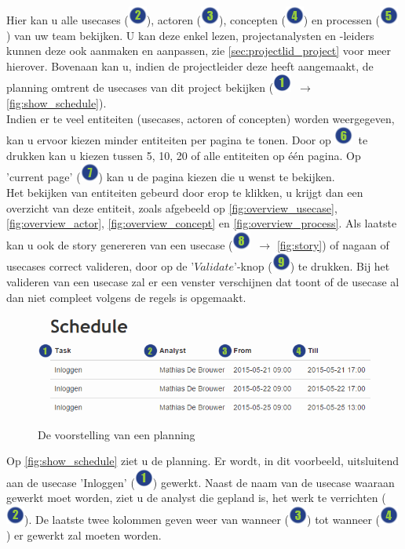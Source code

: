 \documentclass[a4paper,11pt]{article}
\newcommand{\one}{\includegraphics[scale=0.5]{Gebruikershandleiding_img/1.png}}
\newcommand{\two}{\includegraphics[scale=0.5]{Gebruikershandleiding_img/2.png}}
\newcommand{\three}{\includegraphics[scale=0.5]{Gebruikershandleiding_img/3.png}}
\newcommand{\four}{\includegraphics[scale=0.5]{Gebruikershandleiding_img/4.png}}
\newcommand{\five}{\includegraphics[scale=0.5]{Gebruikershandleiding_img/5.png}}
\newcommand{\six}{\includegraphics[scale=0.5]{Gebruikershandleiding_img/6.png}}
\newcommand{\seven}{\includegraphics[scale=0.5]{Gebruikershandleiding_img/7.png}}
\newcommand{\eight}{\includegraphics[scale=0.5]{Gebruikershandleiding_img/8.png}}
\newcommand{\nine}{\includegraphics[scale=0.5]{Gebruikershandleiding_img/9.png}}
\begin{document}
Hier kan u alle usecases (\two), actoren (\three), concepten (\four) en processen (\five) van uw team bekijken. U kan deze enkel lezen, projectanalysten en -leiders kunnen deze ook aanmaken en aanpassen, zie \autoref{sec:projectlid_project} voor meer hierover. Bovenaan kan u, indien de projectleider deze heeft aangemaakt, de planning omtrent de usecases van dit project bekijken (\one\ $\rightarrow$ \autoref{fig:show_schedule}).\\
Indien er te veel entiteiten (usecases, actoren of concepten) worden weergegeven, kan u ervoor kiezen minder entiteiten per pagina te tonen. Door op \six\ te drukken kan u kiezen tussen 5, 10, 20 of alle entiteiten op \'e\'en pagina. Op 'current page' (\seven) kan u de pagina kiezen die u wenst te bekijken.\\
Het bekijken van entiteiten gebeurd door erop te klikken, u krijgt dan een overzicht van deze entiteit, zoals afgebeeld op \autoref{fig:overview_usecase}, \ref{fig:overview_actor}, \ref{fig:overview_concept} en \ref{fig:overview_process}.
Als laatste kan u ook de story genereren van een usecase (\eight\ $\rightarrow$ \autoref{fig:story}) of nagaan of usecases correct valideren, door op de '$Validate$'-knop (\nine) te drukken. Bij het valideren van een usecase zal er een venster verschijnen dat toont of de usecase al dan niet compleet volgens de regels is opgemaakt.

\begin{figure}[H]
\centering
\includegraphics[scale=0.5]{Gebruikershandleiding_img/show_schedule.png}
\caption{De voorstelling van een planning}
\label{fig:show_schedule}
\end{figure}

Op \autoref{fig:show_schedule} ziet u de planning. Er wordt, in dit voorbeeld, uitsluitend aan de usecase 'Inloggen' (\one) gewerkt. Naast de naam van de usecase waaraan gewerkt moet worden, ziet u de analyst die gepland is, het werk te verrichten (\two). De laatste twee kolommen geven weer van wanneer (\three) tot wanneer (\four) er gewerkt zal moeten worden.
\end{document}
